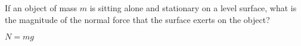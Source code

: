 If an object of mass $m$ is sitting alone and stationary on a level surface, what is the magnitude of the normal force that the surface exerts on the object?

\begin{solution}
    $N = mg$
\end{solution}